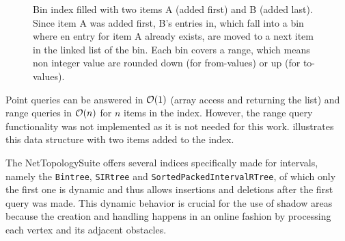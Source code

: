 \begin{figure}[h]
\begin{figcenter}
			\end{figcenter}
			\caption[BinIndex example with two inserted items.]{Bin index filled with two items A (added first) and B (added last). Since item A was added first, B's entries in, which fall into a bin where en entry for item A already exists, are moved to a next item in the linked list of the bin. Each bin covers a range, which means non integer value are rounded down (for from-values) or up (for to-values).}
			\label{fig:bin-index}
		\end{figure}
		
		Point queries can be answered in $\mathcal{O}(1)$ (array access and returning the list) and range queries in $\mathcal{O}(n)$ for $n$ items in the index.
		However, the range query functionality was not implemented as it is not needed for this work.
		 illustrates this data structure with two items added to the index.
		
		The NetTopologySuite offers several indices specifically made for intervals, namely the \texttt{Bintree}, \texttt{SIRtree} and \texttt{SortedPackedIntervalRTree}, of which only the first one is dynamic and thus allows insertions and deletions after the first query was made.
		This dynamic behavior is crucial for the use of shadow areas because the creation and handling happens in an online fashion by processing each vertex and its adjacent obstacles.
		
